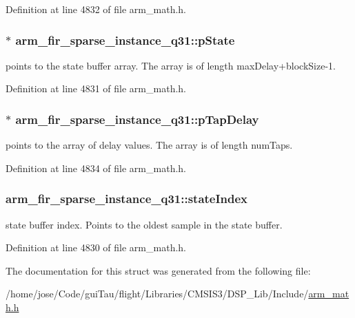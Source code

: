 Definition at line 4832 of file arm\-\_\-math.\-h.

\hypertarget{structarm__fir__sparse__instance__q31_a830be89daa5a393b225048889aa045d1}{
\subsubsection[{p\-State}]{$\ast$ arm\-\_\-fir\-\_\-sparse\-\_\-instance\-\_\-q31\-::p\-State}}\label{structarm__fir__sparse__instance__q31_a830be89daa5a393b225048889aa045d1}
points to the state buffer array. The array is of length max\-Delay+block\-Size-\/1. 

Definition at line 4831 of file arm\-\_\-math.\-h.

\hypertarget{structarm__fir__sparse__instance__q31_ab87ae457adec8f727afefaa2599fc983}{
\subsubsection[{p\-Tap\-Delay}]{$\ast$ arm\-\_\-fir\-\_\-sparse\-\_\-instance\-\_\-q31\-::p\-Tap\-Delay}}\label{structarm__fir__sparse__instance__q31_ab87ae457adec8f727afefaa2599fc983}
points to the array of delay values. The array is of length num\-Taps. 

Definition at line 4834 of file arm\-\_\-math.\-h.

\hypertarget{structarm__fir__sparse__instance__q31_a557ed9d477e76e4ad2019344f19f568a}{
\subsubsection[{state\-Index}]{ arm\-\_\-fir\-\_\-sparse\-\_\-instance\-\_\-q31\-::state\-Index}}\label{structarm__fir__sparse__instance__q31_a557ed9d477e76e4ad2019344f19f568a}
state buffer index. Points to the oldest sample in the state buffer. 

Definition at line 4830 of file arm\-\_\-math.\-h.



The documentation for this struct was generated from the following file\-:\begin{DoxyCompactItemize}
\item 
/home/jose/\-Code/gui\-Tau/flight/\-Libraries/\-C\-M\-S\-I\-S3/\-D\-S\-P\-\_\-\-Lib/\-Include/\hyperlink{arm__math_8h}{arm\-\_\-math.\-h}\end{DoxyCompactItemize}
